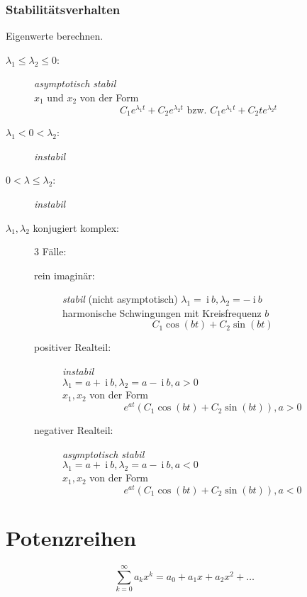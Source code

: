 \documentclass[12pt]{article}
\newcommand{\ci}{\:\mathrm{i}\:}
\begin{document}
\begin{multicols*}{3}
				\subsubsection{Stabilitätsverhalten} %
					Eigenwerte berechnen.
					\begin{description}
						\item[$\lambda_1 \leq \lambda_2 \leq 0$:]
						\emph{asymptotisch stabil} \\
						$x_1$ und $x_2$ von der Form
						\[
							C_1 e^{\lambda_1 t} + C_2 e^{\lambda_2 t} \text{ bzw. } C_1 e^{\lambda_1 t} + C_2 t e^{\lambda_2 t}
						\]
						\item[$\lambda_1 < 0 < \lambda_2$:] \emph{instabil}
						\item[$0 < \lambda \leq \lambda_2$:] \emph{instabil}
						\item[$\lambda_1, \lambda_2$ konjugiert komplex:] 3 Fälle:
							\begin{description}
								\item[rein imaginär:] \emph{stabil} (nicht asymptotisch)
								$\lambda_1 = \ci b, \lambda_2 = - \ci b$ \\
								harmonische Schwingungen mit Kreisfrequenz $b$
								\[
									C_1 \cos (bt) + C_2 \sin (bt)
								\]
								\item[positiver Realteil:] \emph{instabil} \\
								$\lambda_1 = a + \ci b, \lambda_2 = a - \ci b, a > 0$ \\
								$x_1, x_2$ von der Form
								\[
									e^{at}(C_1 \cos(bt) + C_2 \sin (bt)), a > 0
								\]
								\item[negativer Realteil:] \emph{asymptotisch stabil} \\
								$\lambda_1 = a + \ci b, \lambda_2 = a - \ci b, a < 0$ \\
								$x_1, x_2$ von der Form
								\[
									e^{at}(C_1 \cos(bt) + C_2 \sin (bt)), a < 0
								\]
							\end{description}
					\end{description}
		\section{Potenzreihen} %
			\[
				\sum_{k=0}^{\infty} a_k x^k = a_0 + a_1 x + a_2 x^2 + \dots
			\]
	\end{multicols*}
\end{document}
